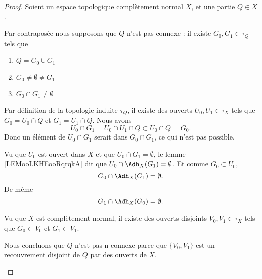 \begin{proof}
	Soient un espace topologique complètement normal \( X\), et une partie \( Q\in X\).

	\begin{subproof}
		\spitem[Contraposée]
		Par contraposée nous supposons que \( Q\) n'est pas connexe : il existe \( G_0,G_1\in \tau_Q\) tels que
		\begin{enumerate}
			\item
			      \( Q=G_0\cup G_1\)
			\item
			      \( G_0\neq\emptyset\neq G_1\)
			\item
			      \( G_0\cap G_1\neq \emptyset\)
		\end{enumerate}
		Par définition de la topologie induite \( \tau_Q\), il existe des ouverts \( U_0,U_1\in \tau_X\) tels que \( G_0=U_0\cap Q\) et \( G_1=U_1\cap Q\).
		\spitem[\( U_0\cap G_1=\emptyset\)]
		Nous avons
		\begin{equation}
			U_0\cap G_1=U_0\cap U_1\cap Q\subset U_0\cap Q=G_0.
		\end{equation}
		Donc un élément de \( U_0\cap G_1\) serait dans \( G_0\cap G_1\), ce qui n'est pas possible.

		\spitem[Fermeture]
		Vu que \( U_0\) est ouvert dans \( X\) et que \( U_0\cap G_1=\emptyset\), le lemme \ref{LEMooLKHEooRqrqkA} dit que \( U_0\cap \Adh_X(G_1)=\emptyset\). Et comme \( G_0\subset U_0\),
		\begin{equation}
			G_0\cap\Adh_X(G_1)=\emptyset.
		\end{equation}
		De même
		\begin{equation}
			G_1\cap\Adh_X(G_0)=\emptyset.
		\end{equation}

		Vu que \( X\) est complètement normal, il existe des ouverts disjoints \( V_0,V_1\in \tau_X\) tels que \( G_0\subset V_0\) et \( G_1\subset V_1\).

		\spitem[Conclusion]
		Nous concluons que \( Q\) n'est pas n-connexe parce que \( \{ V_0,V_1 \}\) est un recouvrement disjoint de \( Q\) par des ouverts de \( X\).
	\end{subproof}
\end{proof}

